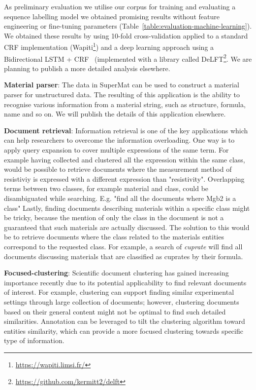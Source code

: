 \documentclass[fleqn,10pt]{wlscirep}
\begin{document}
As preliminary evaluation we utilise our corpus for training and evaluating a sequence labelling model we obtained promising results without feature engineering or fine-tuning parameters (Table~\ref{table:evaluation-machine-learning}).
We obtained these results by using 10-fold cross-validation applied to a standard CRF implementation (Wapiti\footnote{\url{https://wapiti.limsi.fr/}}) and a deep learning approach using a Bidirectional LSTM + CRF~\cite{Lample2016NeuralAF} (implemented with a library called DeLFT\footnote{\url{https://github.com/kermitt2/delft}}. We are planning to publish a more detailed analysis elsewhere. 


\textbf{Material parser}: The data in SuperMat can be used to construct a material parser for unstructured data. 
The resulting of this application is the ability to recognise various information from a material string, such as structure, formula, name and so on. 
We will publish the details of this application elsewhere. 

\textbf{Document retrieval}: Information retrieval is one of the key applications which can help researchers to overcome the information overloading.
One way is to apply query expansion to cover multiple expressions of the same term. 
For example having collected and clustered all the expression within the same class, would be possible to retrieve documents where the measurement method of resistiviy is expressed with a different expression than "resistivity".
Overlapping terms between two classes, for example material and class, could be disambiguated while searching. E.g. "find all the documents where Mgb2 is a class" 
Lastly, finding documents describing materials within a specific class might be tricky, because the mention of only the class in the document is not a guaranteed that such materials are actually discussed. The solution to this would be to retrieve documents where the class related to the materials entities correspond to the requested class. 
For example, a search of \textit{cuprate} will find all documents discussing materials that are classified as cuprates by their formula.

\textbf{Focused-clustering}: Scientific document clustering has gained increasing importance recently due to its potential applicability to find relevant documents of interest. 
For example, clustering can support finding similar experimental settings through large collection of documents; however, clustering documents based on their general content might not be optimal to find such detailed similarities. 
Annotation can be leveraged to tilt the clustering algorithm toward entities similarity, which can provide a more focused clustering towards specific type of information.
\end{document}
